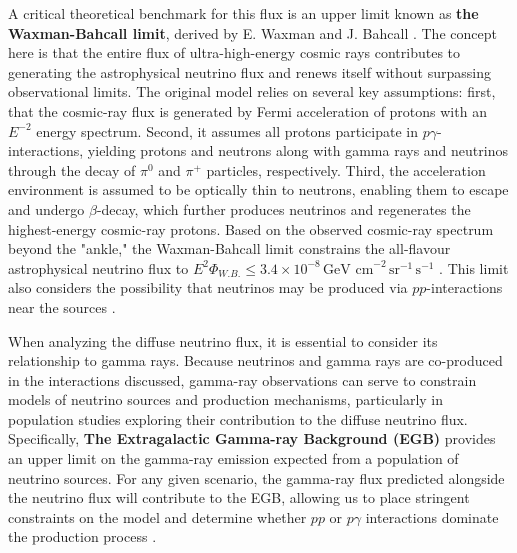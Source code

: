 A critical theoretical benchmark for this flux is an upper limit known as \textbf{the Waxman-Bahcall limit}, derived by E. Waxman and J. Bahcall . The concept here is that the entire flux of ultra-high-energy cosmic rays contributes to generating the astrophysical neutrino flux and renews itself without surpassing observational limits. The original model relies on several key assumptions: first, that the cosmic-ray flux is generated by Fermi acceleration of protons with an \(E^{-2}\) energy spectrum. Second, it assumes all protons participate in \(p\gamma\)-interactions, yielding protons and neutrons along with gamma rays and neutrinos through the decay of \(\pi^0\) and \(\pi^+\) particles, respectively. Third, the acceleration environment is assumed to be optically thin to neutrons, enabling them to escape and undergo \(\beta\)-decay, which further produces neutrinos and regenerates the highest-energy cosmic-ray protons. Based on the observed cosmic-ray spectrum beyond the "ankle," the Waxman-Bahcall limit constrains the all-flavour astrophysical neutrino flux to $E^2 \Phi_{W.B.} \leq 3.4 \times 10^{-8} \, \text{GeV cm}^{-2} \, \text{sr}^{-1} \, \text{s}^{-1}$ . This limit also considers the possibility that neutrinos may be produced via \(pp\)-interactions near the sources .

When analyzing the diffuse neutrino flux, it is essential to consider its relationship to gamma rays. Because neutrinos and gamma rays are co-produced in the interactions discussed, gamma-ray observations can serve to constrain models of neutrino sources and production mechanisms, particularly in population studies exploring their contribution to the diffuse neutrino flux. Specifically, \textbf{The Extragalactic Gamma-ray Background (EGB)}  provides an upper limit on the gamma-ray emission expected from a population of neutrino sources. For any given scenario, the gamma-ray flux predicted alongside the neutrino flux will contribute to the EGB, allowing us to place stringent constraints on the model and determine whether \(pp\) or \(p\gamma\) interactions dominate the production process .

